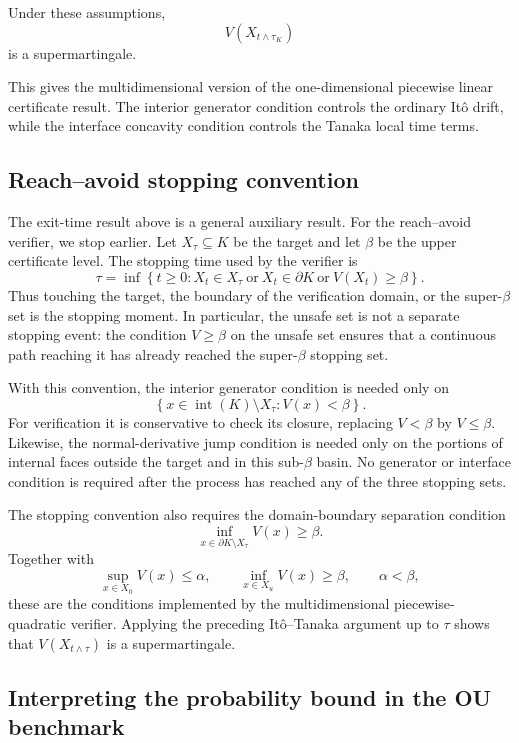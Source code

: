 Under these assumptions,
\[
V(X_{t \wedge \tau_K})
\]
is a supermartingale.

This gives the multidimensional version of the one-dimensional piecewise linear
certificate result. The interior generator condition controls the ordinary Itô
drift, while the interface concavity condition controls the Tanaka local time
terms.

\subsection{Reach--avoid stopping convention}

The exit-time result above is a general auxiliary result.  For the
reach--avoid verifier, we stop earlier.  Let $X_\tau\subseteq K$ be the target
and let $\beta$ be the upper certificate level.  The stopping time used by the
verifier is
\[
\tau
=
\inf\left\{t\geq0:
X_t\in X_\tau
\ \text{or}\
X_t\in\partial K
\ \text{or}\
V(X_t)\geq\beta
\right\}.
\]
Thus touching the target, the boundary of the verification domain, or the
super-$\beta$ set is the stopping moment.  In particular, the unsafe set is
not a separate stopping event: the condition $V\geq\beta$ on the unsafe set
ensures that a continuous path reaching it has already reached the
super-$\beta$ stopping set.

With this convention, the interior generator condition is needed only on
\[
\left\{x\in\operatorname{int}(K)\setminus X_\tau:V(x)<\beta\right\}.
\]
For verification it is conservative to check its closure, replacing
$V<\beta$ by $V\leq\beta$.  Likewise, the normal-derivative jump condition is
needed only on the portions of internal faces outside the target and in this
sub-$\beta$ basin.  No generator or interface condition is required after the
process has reached any of the three stopping sets.

The stopping convention also requires the domain-boundary separation
condition
\[
\inf_{x\in\partial K\setminus X_\tau}V(x)\geq\beta.
\]
Together with
\[
\sup_{x\in X_0}V(x)\leq\alpha,
\qquad
\inf_{x\in X_u}V(x)\geq\beta,
\qquad
\alpha<\beta,
\]
these are the conditions implemented by the multidimensional
piecewise-quadratic verifier.  Applying the preceding It\^o--Tanaka argument
up to $\tau$ shows that $V(X_{t\wedge\tau})$ is a supermartingale.

\subsection{Interpreting the probability bound in the OU benchmark}

